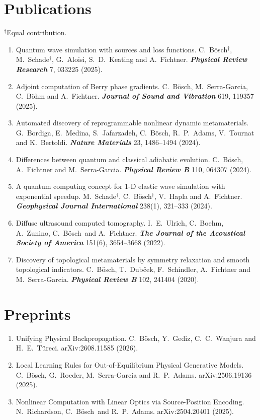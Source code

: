 \documentclass[11pt]{article}
\newcommand{\me}{C.~Bösch}
\newcommand{\journal}[1]{\textbf{\emph{#1}}}
\begin{document}
\section*{Publications}
{\small $^\dagger$Equal contribution.}
\begin{enumerate}
  \item Quantum wave simulation with sources and loss functions. \me$^\dagger$, M.~Schade$^\dagger$, G.~Aloisi, S.~D.~Keating and A.~Fichtner. \journal{Physical Review Research} 7, 033225 (2025).
  \item Adjoint computation of Berry phase gradients. \me, M.~Serra-Garcia, C.~Böhm and A.~Fichtner. \journal{Journal of Sound and Vibration} 619, 119357 (2025).
  \item Automated discovery of reprogrammable nonlinear dynamic metamaterials. G.~Bordiga, E.~Medina, S.~Jafarzadeh, \me, R.~P.~Adams, V.~Tournat and K.~Bertoldi. \journal{Nature Materials} 23, 1486--1494 (2024).
  \item Differences between quantum and classical adiabatic evolution. \me, A.~Fichtner and M.~Serra-Garcia. \journal{Physical Review B} 110, 064307 (2024).
  \item A quantum computing concept for 1-D elastic wave simulation with exponential speedup. M.~Schade$^\dagger$, \me$^\dagger$, V.~Hapla and A.~Fichtner. \journal{Geophysical Journal International} 238(1), 321--333 (2024).
  \item Diffuse ultrasound computed tomography. I.~E.~Ulrich, C.~Boehm, A.~Zunino, \me\ and A.~Fichtner. \journal{The Journal of the Acoustical Society of America} 151(6), 3654--3668 (2022).
  \item Discovery of topological metamaterials by symmetry relaxation and smooth topological indicators. \me, T.~Dubček, F.~Schindler, A.~Fichtner and M.~Serra-Garcia. \journal{Physical Review B} 102, 241404 (2020).
\end{enumerate}

\section*{Preprints}
\begin{enumerate}
  \item Unifying Physical Backpropagation. \me, Y.~Gediz, C.~C.~Wanjura and H.~E.~Türeci. arXiv:2608.11585 (2026).
  \item Local Learning Rules for Out-of-Equilibrium Physical Generative Models. \me, G.~Roeder, M.~Serra-Garcia and R.~P.~Adams. arXiv:2506.19136 (2025).
  \item Nonlinear Computation with Linear Optics via Source-Position Encoding. N.~Richardson, \me\ and R.~P.~Adams. arXiv:2504.20401 (2025).
\end{enumerate}
\end{document}
